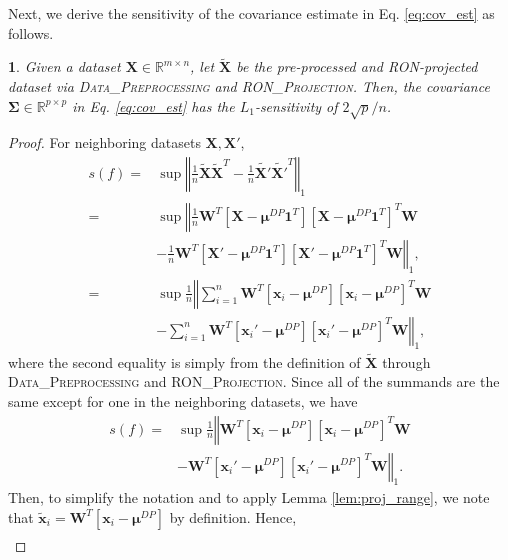 \documentclass[USenglish,oneside,twocolumn]{article}
\newcommand{\noun}[1]{\textsc{#1}}
\theoremstyle{definition}
\theoremstyle{remark}
\theoremstyle{plain}
\theoremstyle{plain}
\newtheorem{lem}{\protect\lemmaname}
\providecommand{\lemmaname}{Lemma}
\begin{document}
Next, we derive the sensitivity of the covariance estimate in Eq.
\eqref{eq:cov_est} as follows.
\begin{lem}
\label{lem:sens_cov} Given a dataset $\mathbf{X}\in\mathbb{R}^{m\times n}$,
let $\widetilde{\mathbf{X}}$ be the pre-processed and RON-projected
dataset via \noun{Data\_Preprocessing} and \noun{RON\_Projection}.
Then, the covariance $\boldsymbol{\Sigma}\in\mathbb{R}^{p\times p}$
in Eq. \eqref{eq:cov_est} has the $L_{1}$-sensitivity of $2\sqrt{p}/n$.
\end{lem}
\begin{proof}
For neighboring datasets $\mathbf{X},\mathbf{X}'$,
\begin{align*}
s(f)= & \sup\left\Vert \frac{1}{n}\widetilde{\mathbf{X}}\widetilde{\mathbf{X}}^{T}-\frac{1}{n}\widetilde{\mathbf{X}'}\widetilde{\mathbf{X}'}^{T}\right\Vert _{1}\\
= & \sup\left\Vert \frac{1}{n}\mathbf{W}^{T}[\mathbf{X}-\boldsymbol{\mu}^{DP}\mathbf{1}^{T}][\mathbf{X}-\boldsymbol{\mu}^{DP}\mathbf{1}^{T}]^{T}\mathbf{W}\right.\\
 & -\left.\frac{1}{n}\mathbf{W}^{T}[\mathbf{X}'-\boldsymbol{\mu}^{DP}\mathbf{1}^{T}][\mathbf{X}'-\boldsymbol{\mu}^{DP}\mathbf{1}^{T}]^{T}\mathbf{W}\right\Vert _{1},\\
= & \sup\frac{1}{n}\left\Vert \sum_{i=1}^{n}\mathbf{W}^{T}[\mathbf{x}_{i}-\boldsymbol{\mu}^{DP}][\mathbf{x}_{i}-\boldsymbol{\mu}^{DP}]^{T}\mathbf{W}\right.\\
 & -\left.\sum_{i=1}^{n}\mathbf{W}^{T}[\mathbf{x}_{i}'-\boldsymbol{\mu}^{DP}][\mathbf{x}_{i}'-\boldsymbol{\mu}^{DP}]^{T}\mathbf{W}\right\Vert _{1},
\end{align*}
where the second equality is simply from the definition of $\widetilde{\mathbf{X}}$
through\noun{ Data\_Preprocessing} and \noun{RON\_Projection}. Since
all of the summands are the same except for one in the neighboring
datasets, we have
\begin{align*}
s(f)= & \sup\frac{1}{n}\left\Vert \mathbf{W}^{T}[\mathbf{x}_{i}-\boldsymbol{\mu}^{DP}][\mathbf{x}_{i}-\boldsymbol{\mu}^{DP}]^{T}\mathbf{W}\right.\\
 & -\left.\mathbf{W}^{T}[\mathbf{x}_{i}'-\boldsymbol{\mu}^{DP}][\mathbf{x}_{i}'-\boldsymbol{\mu}^{DP}]^{T}\mathbf{W}\right\Vert _{1}.
\end{align*}
Then, to simplify the notation and to apply Lemma \ref{lem:proj_range},
we note that $\widetilde{\mathbf{x}}_{i}=\mathbf{W}^{T}[\mathbf{x}_{i}-\boldsymbol{\mu}^{DP}]$
by definition. Hence, 
\begin{align*}

\end{align*}
\end{proof}
\end{document}
